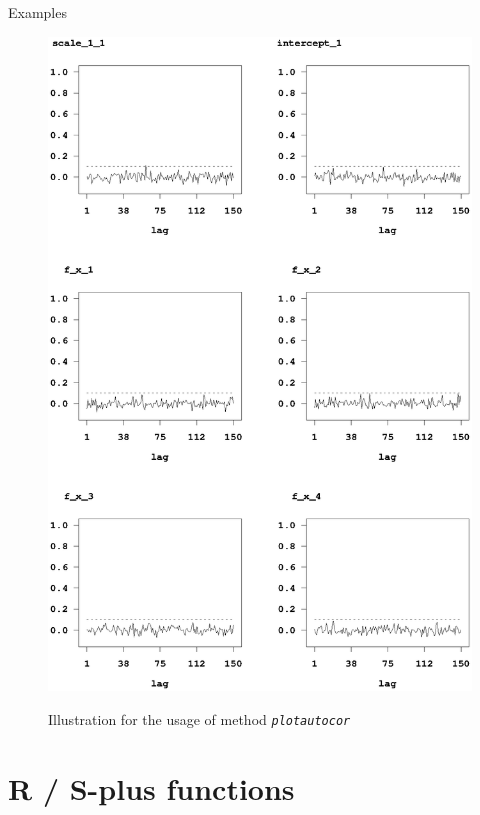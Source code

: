 \begin{stanza}{Examples}
\begin{figure}[ht]
\begin{center}
\includegraphics[scale=0.8]{grafiken/autocorexample1.ps}
{\em\caption{ \label{autocorexample} Illustration for the usage of
method \em\texttt{plotautocor}}}
\end{center}
\end{figure}

\end{stanza}

\clearpage

\section{R / S-plus functions} \label{splus} 

